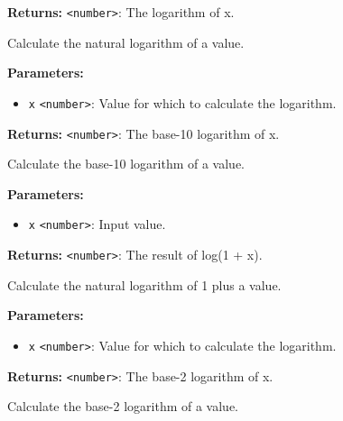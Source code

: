 \documentclass[12pt,a4paper]{article}
\begin{document}
\noindent \textbf{Returns:} \texttt{<number>}: The logarithm of x.

\noindent Calculate the natural logarithm of a value.

\vspace{5mm}
\noindent {}


\noindent \textbf{Parameters:}
\begin{itemize}
  \item \texttt{x} \texttt{<number>}: Value for which to calculate the logarithm.
\end{itemize}

\noindent \textbf{Returns:} \texttt{<number>}: The base-10 logarithm of x.

\noindent Calculate the base-10 logarithm of a value.

\vspace{5mm}
\noindent {}


\noindent \textbf{Parameters:}
\begin{itemize}
  \item \texttt{x} \texttt{<number>}: Input value.
\end{itemize}

\noindent \textbf{Returns:} \texttt{<number>}: The result of log(1 + x).

\noindent Calculate the natural logarithm of 1 plus a value.

\vspace{5mm}
\noindent {}


\noindent \textbf{Parameters:}
\begin{itemize}
  \item \texttt{x} \texttt{<number>}: Value for which to calculate the logarithm.
\end{itemize}

\noindent \textbf{Returns:} \texttt{<number>}: The base-2 logarithm of x.

\noindent Calculate the base-2 logarithm of a value.

\vspace{5mm}
\noindent {}\vspace{4mm}
\end{document}
